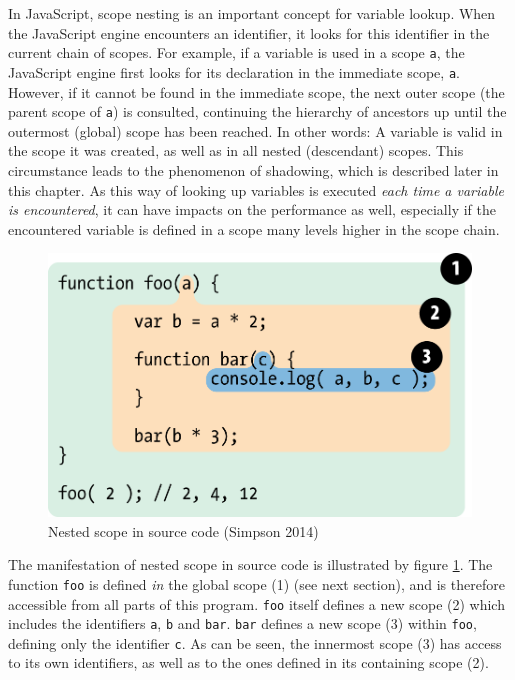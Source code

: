 In JavaScript, scope nesting is an important concept for variable
lookup. When the JavaScript engine encounters an identifier, it looks
for this identifier in the current chain of scopes. For example, if a
variable is used in a scope \texttt{a}, the JavaScript engine first
looks for its declaration in the immediate scope, \texttt{a}. However,
if it cannot be found in the immediate scope, the next outer scope (the
parent scope of \texttt{a}) is consulted, continuing the hierarchy of
ancestors up until the outermost (global) scope has been reached. In
other words: A variable is valid in the scope it was created, as well as
in all nested (descendant) scopes. This circumstance leads to the
phenomenon of shadowing, which is described later in this chapter. As
this way of looking up variables is executed \emph{each time a variable
is encountered}, it can have impacts on the performance as well,
especially if the encountered variable is defined in a scope many levels
higher in the scope chain.

\begin{figure}[htbp]
\centering
\includegraphics[keepaspectratio]{img/fig2.png}
\caption{Nested scope in source code (Simpson 2014)}
\label{fig:getify}
\end{figure}

The manifestation of nested scope in source code is illustrated by
figure \ref{fig:getify}. The function \texttt{foo} is defined \emph{in}
the global scope (1) (see next section), and is therefore accessible
from all parts of this program. \texttt{foo} itself defines a new scope
(2) which includes the identifiers \texttt{a}, \texttt{b} and
\texttt{bar}. \texttt{bar} defines a new scope (3) within \texttt{foo},
defining only the identifier \texttt{c}. As can be seen, the innermost
scope (3) has access to its own identifiers, as well as to the ones
defined in its containing scope (2).

